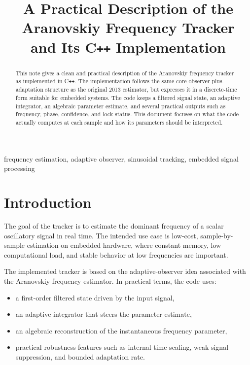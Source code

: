 \documentclass[conference]{IEEEtran}
\title{A Practical Description of the Aranovskiy Frequency Tracker\\
and Its C\texttt{++} Implementation}
\author{%
    \IEEEauthorblockN{Mikhail S.\ Grushinskiy}
    \IEEEauthorblockA{Independent Researcher\\
    Bareboat Necessities Project\\
    \texttt{mgrouch@users.github.com}}
}
\begin{document}
    \maketitle

    \begin{abstract}
        This note gives a clean and practical description of the Aranovskiy
        frequency tracker as implemented in C\texttt{++}. The implementation follows
        the same core observer-plus-adaptation structure as the original 2013
        estimator, but expresses it in a discrete-time form suitable for embedded
        systems. The code keeps a filtered signal state, an adaptive integrator,
        an algebraic parameter estimate, and several practical outputs such as
        frequency, phase, confidence, and lock status. This document focuses on what
        the code actually computes at each sample and how its parameters should be
        interpreted.
    \end{abstract}

    \begin{IEEEkeywords}
        frequency estimation, adaptive observer, sinusoidal tracking, embedded signal processing
    \end{IEEEkeywords}

    \section{Introduction}

    The goal of the tracker is to estimate the dominant frequency of a scalar
    oscillatory signal in real time. The intended use case is low-cost,
    sample-by-sample estimation on embedded hardware, where constant memory,
    low computational load, and stable behavior at low frequencies are important.

    The implemented tracker is based on the adaptive-observer idea associated
    with the Aranovskiy frequency estimator. In practical terms, the code uses:
    \begin{itemize}
        \item a first-order filtered state driven by the input signal,
        \item an adaptive integrator that steers the parameter estimate,
        \item an algebraic reconstruction of the instantaneous frequency parameter,
        \item practical robustness features such as internal time scaling,
        weak-signal suppression, and bounded adaptation rate.
    \end{itemize}
\end{document}

